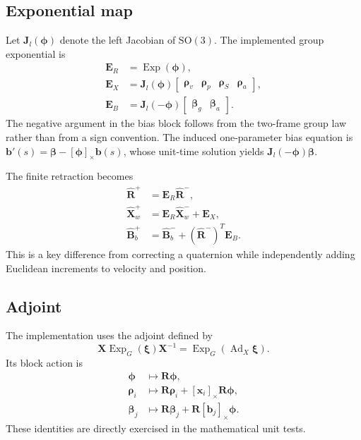 \documentclass[conference]{IEEEtran}
\newcommand{\SO}{\mathrm{SO}}
\newcommand{\Skew}[1]{\left[#1\right]_\times}
\DeclareMathOperator{\Exp}{Exp}
\DeclareMathOperator{\Ad}{Ad}
\theoremstyle{bodysmall}
\begin{document}
\subsection{Exponential map}
Let $\bm{J}_l(\bm{\phi})$ denote the left Jacobian of $\SO(3)$. The implemented group exponential is
\begin{align}
\bm{E}_R &= \Exp(\bm{\phi}),\\
\bm{E}_X &= \bm{J}_l(\bm{\phi})\begin{bmatrix}\bm{\rho}_v&\bm{\rho}_p&\bm{\rho}_S&\bm{\rho}_a\end{bmatrix},\\
\bm{E}_B &= \bm{J}_l(-\bm{\phi})\begin{bmatrix}\bm{\beta}_g&\bm{\beta}_a\end{bmatrix}.
\end{align}
The negative argument in the bias block follows from the two-frame group law rather than from a sign convention. The induced one-parameter bias equation is $\bm{b}'(s)=\bm{\beta}-\Skew{\bm{\phi}}\bm{b}(s)$, whose unit-time solution yields $\bm{J}_l(-\bm{\phi})\bm{\beta}$.

The finite retraction becomes
\begin{align}
\hat {\bm{R}}^+ &= \bm{E}_R\hat {\bm{R}}^-,\\
\hat {\bm{X}}_w^+ &= \bm{E}_R\hat {\bm{X}}_w^-+\bm{E}_X,\\
\hat {\bm{B}}_b^+ &= \hat {\bm{B}}_b^-+(\hat {\bm{R}}^-)^T\bm{E}_B.
\end{align}
This is a key difference from correcting a quaternion while independently adding Euclidean increments to velocity and position.

\subsection{Adjoint}
The implementation uses the adjoint defined by
\begin{equation}
\bm{X}\Exp_G(\bm{\xi})\bm{X}^{-1}=\Exp_G(\Ad_X\bm{\xi}).
\end{equation}
Its block action is
\begin{align}
\bm{\phi} &\mapsto \bm{R}\bm{\phi},\\
\bm{\rho}_i &\mapsto \bm{R}\bm{\rho}_i+\Skew{\bm{x}_i}\bm{R}\bm{\phi},\\
\bm{\beta}_j &\mapsto \bm{R}\bm{\beta}_j+\bm{R}\Skew{\bm{b}_j}\bm{\phi}.
\end{align}
These identities are directly exercised in the mathematical unit tests.
\end{document}
